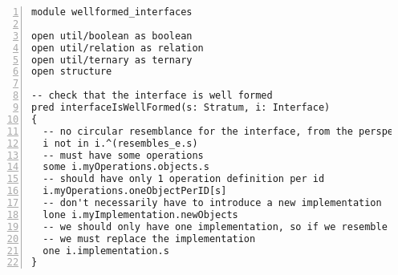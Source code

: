 \lstset{frame=tb, aboveskip=12pt, belowskip=-3pt, breaklines=true, basicstyle=\tiny\ttfamily, tabsize=2, mathescape=true}
\begin{lstlisting}[caption={wellformed\_interfaces.als}, numbers=left]
module wellformed_interfaces

open util/boolean as boolean
open util/relation as relation
open util/ternary as ternary
open structure

-- check that the interface is well formed
pred interfaceIsWellFormed(s: Stratum, i: Interface)
{
  -- no circular resemblance for the interface, from the perspective of this stratum
  i not in i.^(resembles_e.s)
  -- must have some operations
  some i.myOperations.objects.s
  -- should have only 1 operation definition per id
  i.myOperations.oneObjectPerID[s]
  -- don't necessarily have to introduce a new implementation
  lone i.myImplementation.newObjects  
  -- we should only have one implementation, so if we resemble something
  -- we must replace the implementation
  one i.implementation.s
}
\end{lstlisting}
